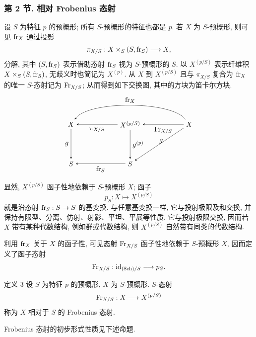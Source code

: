 \subsubsection*{第 2 节. 相对 Frobenius 态射}

设 $S$ 为特征 $p$ 的预概形; 所有 $S$-预概形的特征也都是 $p$. 若 $X$ 为 $S$-预概形, 则可见 $\operatorname{fr}_X$ 通过投影
\[
\pi_{X/S}:X\times_S(S,\operatorname{fr}_S)\longrightarrow X,
\]
分解, 其中 $(S,\operatorname{fr}_S)$ 表示借助态射 $\operatorname{fr}_S$ 视为 $S$-预概形的 $S$. 以 $X^{(p/S)}$ 表示纤维积 $X\times_S(S,\operatorname{fr}_S)$, 无歧义时也简记为 $X^{(p)}$. 从 $X$ 到 $X^{(p/S)}$ 且与 $\pi_{X/S}$ 复合为 $\operatorname{fr}_X$ 的唯一 $S$-态射记为 $\operatorname{Fr}_{X/S}$; 从而得到如下交换图, 其中的方块为笛卡尔方块.
\[
\begin{tikzpicture}[baseline=(current bounding box.center),>=stealth]
\node (XL) at (0,2.0) {$X$};
\node (XM) at (3.0,2.0) {$X^{(p/S)}$};
\node (XR) at (6.0,2.0) {$X$};
\node (SL) at (0,0) {$S$};
\node (SM) at (3.0,0) {$S$};
\draw[->] (XM) -- node[below] {$\pi_{X/S}$} (XL);
\draw[->] (XR) -- node[below] {$\Fr_{X/S}$} (XM);
\draw[->] (XR) .. controls (5.1,3.2) and (0.9,3.2) .. node[above] {$\fr_X$} (XL);
\draw[->] (XL) -- node[left] {$g$} (SL);
\draw[->] (XM) -- node[right] {$g^{(p)}$} (SM);
\draw[->] (XR) -- node[pos=.55,above right] {$g$} (SM);
\draw[->] (SM) -- node[below] {$\fr_S$} (SL);
\end{tikzpicture}
\]

显然, $X^{(p/S)}$ 函子性地依赖于 $S$-预概形 $X$; 函子
\[
p_S:X\longmapsto X^{(p/S)}
\]
就是沿态射 $\operatorname{fr}_S:S\to S$ 的基变换. 与任意基变换一样, 它与投射极限及和交换, 并保持有限型、分离、仿射、射影、平坦、平展等性质. 它与投射极限交换, 因而若 $X$ 带有某种代数结构, 例如群或代数结构, 则 $X^{(p/S)}$ 自然带有同类的代数结构.

利用 $\operatorname{fr}_X$ 关于 $X$ 的函子性, 可见态射 $\operatorname{Fr}_{X/S}$ 函子性地依赖于 $S$-预概形 $X$, 因而定义了函子态射
\[
\operatorname{Fr}_{X/S}:\operatorname{id}_{(\operatorname{Sch})/S}\longrightarrow p_S
.\]


\begin{statement}{定义 3}
设 $S$ 为特征 $p$ 的预概形, $X$ 为 $S$-预概形. $S$-态射
\[
\operatorname{Fr}_{X/S}:X\longrightarrow X^{(p/S)}
\]
称为 $X$ 相对于 $S$ 的 Frobenius 态射.
\end{statement}

Frobenius 态射的初步形式性质见下述命题.

